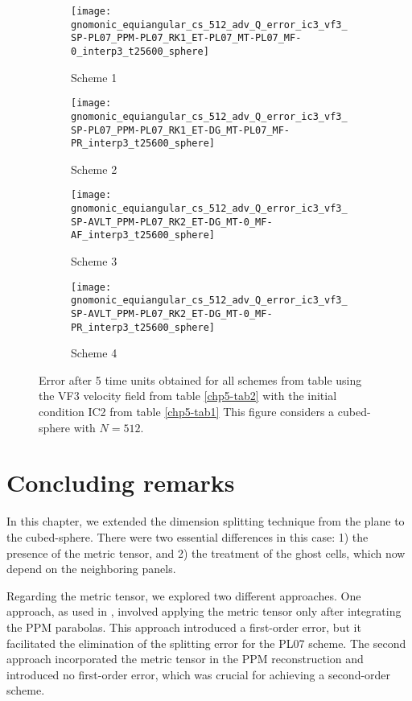 \begin{figure}[!htb]
	\centering
	\begin{subfigure}{0.35\textwidth}
		\centering
		\texttt{[image: gnomonic\_equiangular\_cs\_512\_adv\_Q\_error\_ic3\_vf3\_SP-PL07\_PPM-PL07\_RK1\_ET-PL07\_MT-PL07\_MF-0\_interp3\_t25600\_sphere]}
		\caption{Scheme 1 \label{chp5-adv4-s1}}
	\end{subfigure}
	\begin{subfigure}{0.35\textwidth}
		\centering
		\texttt{[image: gnomonic\_equiangular\_cs\_512\_adv\_Q\_error\_ic3\_vf3\_SP-PL07\_PPM-PL07\_RK1\_ET-DG\_MT-PL07\_MF-PR\_interp3\_t25600\_sphere]}
		\caption{Scheme 2 \label{chp5-adv4-s2}}
	\end{subfigure}
	
	\begin{subfigure}{0.35\textwidth}
		\centering
		\texttt{[image: gnomonic\_equiangular\_cs\_512\_adv\_Q\_error\_ic3\_vf3\_SP-AVLT\_PPM-PL07\_RK2\_ET-DG\_MT-0\_MF-AF\_interp3\_t25600\_sphere]}
		\caption{Scheme 3 \label{chp5-adv4-s3}}
	\end{subfigure}
	\begin{subfigure}{0.35\textwidth}
		\centering
		\texttt{[image: gnomonic\_equiangular\_cs\_512\_adv\_Q\_error\_ic3\_vf3\_SP-AVLT\_PPM-PL07\_RK2\_ET-DG\_MT-0\_MF-PR\_interp3\_t25600\_sphere]}
		\caption{Scheme 4 \label{chp5-adv4-s4}}
	\end{subfigure}
	\caption{ Error after 5 time units obtained for all schemes from table using the VF3 velocity field from table \ref{chp5-tab2} with the initial condition IC2 from  table \ref{chp5-tab1} 
		This figure considers a cubed-sphere with $N=512$. \label{chp5-adv4}}
\end{figure}



\section{Concluding remarks}
\label{chp-cs-conc}
In this chapter, we extended the dimension splitting technique from the plane to the 
cubed-sphere. There were two essential differences in this case: 1) the presence of the 
metric tensor, and 2) the treatment of the ghost cells, which now depend on the neighboring 
panels.

Regarding the metric tensor, we explored two different approaches. One approach, as used in 
\citet{putman:2007}, involved applying the metric tensor only after integrating the PPM parabolas. 
This approach introduced a first-order error, but it facilitated the elimination of the 
splitting error for the PL07 scheme. The second approach incorporated the metric tensor in 
the PPM reconstruction and introduced no first-order error, which was crucial for achieving 
a second-order scheme.

